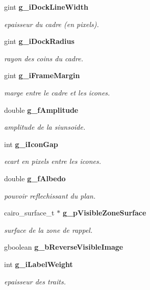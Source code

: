 \begin{CompactItemize}
gint {\bf g\_\-i\-Dock\-Line\-Width}
\begin{CompactList}\small\item\em epaisseur du cadre (en pixels). \item\end{CompactList}\item 
gint {\bf g\_\-i\-Dock\-Radius}
\begin{CompactList}\small\item\em rayon des coins du cadre. \item\end{CompactList}\item 
gint {\bf g\_\-i\-Frame\-Margin}
\begin{CompactList}\small\item\em marge entre le cadre et les icones. \item\end{CompactList}\item 
double {\bf g\_\-f\-Amplitude}
\begin{CompactList}\small\item\em amplitude de la siunsoide. \item\end{CompactList}\item 
int {\bf g\_\-i\-Icon\-Gap}
\begin{CompactList}\small\item\em ecart en pixels entre les icones. \item\end{CompactList}\item 
double {\bf g\_\-f\-Albedo}
\begin{CompactList}\small\item\em pouvoir reflechissant du plan. \item\end{CompactList}\item 
cairo\_\-surface\_\-t $\ast$ {\bf g\_\-p\-Visible\-Zone\-Surface}
\begin{CompactList}\small\item\em surface de la zone de rappel. \item\end{CompactList}\item 
gboolean {\bf g\_\-b\-Reverse\-Visible\-Image}
\item 
int {\bf g\_\-i\-Label\-Weight}
\begin{CompactList}\small\item\em epaisseur des traits. \item\end{CompactList}\item 

\end{CompactItemize}
